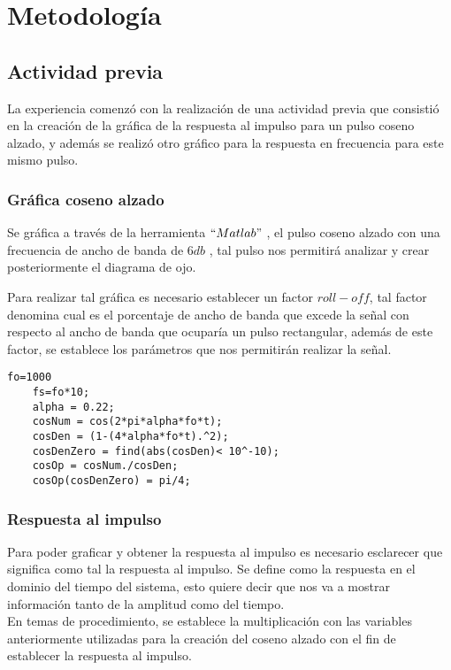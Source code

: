 \section{Metodología}\label{sec:metodologia}

    \subsection{\textbf{Actividad previa}}%
    
    La experiencia comenzó con la realización de una actividad previa que consistió en la  creación de la gráfica de la respuesta al impulso para un pulso coseno alzado, y  además se realizó otro gráfico para la respuesta en frecuencia para este mismo pulso.

        \subsubsection{\textbf{Gráfica coseno alzado}}
        
        Se gráfica a través de la herramienta $``Matlab"$ , el pulso coseno alzado con una frecuencia de ancho de banda de $6 db$ , tal pulso nos permitirá analizar y crear  posteriormente  el diagrama de ojo.
        
        Para realizar tal gráfica es necesario establecer un factor $roll-off$, tal factor denomina cual es el porcentaje de ancho de banda que excede la señal con respecto al ancho de banda que ocuparía un pulso rectangular\cite{WinNT:filtro}, además de este factor, se establece los parámetros  que nos permitirán realizar la señal.

\begin{lstlisting}[language=mat]
 fo=1000
    fs=fo*10;
    alpha = 0.22;
    cosNum = cos(2*pi*alpha*fo*t);
    cosDen = (1-(4*alpha*fo*t).^2);
    cosDenZero = find(abs(cosDen)< 10^-10);
    cosOp = cosNum./cosDen;
    cosOp(cosDenZero) = pi/4;
\end{lstlisting}


       
        
        \subsubsection{\textbf{Respuesta al impulso}}
        
        Para poder graficar y obtener la respuesta al impulso es necesario esclarecer que significa como tal la respuesta al impulso. Se define como la respuesta en el dominio del tiempo del sistema\cite{WinNT:respuestaImpulso}, esto quiere decir que nos va a mostrar información tanto de la amplitud como del tiempo.
        \\
        En temas de procedimiento, se establece la multiplicación con las variables anteriormente utilizadas para la creación del coseno alzado con el fin de establecer la respuesta al impulso.\\
        
